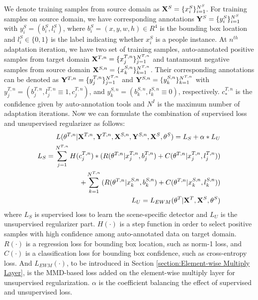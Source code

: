 \documentclass[runningheads]{llncs}
\begin{document}
We denote training samples from source domain as ${\bf X}^{S} = \{x^{S}_{i}\}^{N^{S}}_{i=1}$. For training samples on source domain, we have corresponding annotations ${\bf Y}^{S} = \{y^{S}_{i}\}^{N^{S}}_{i=1}$ with $y^{S}_{i} = (b^{S}_{i},l^{S}_{i})$, where $b^{S}_{i} = (x,y,w,h) \in R^{4}$ is the bounding box location and $l^{S}_{i} \in \{0,1\}$ is the label indicating whether $x^{S}_{i}$ is a people instance. At $n^{th}$ adaptation iteration, we have two set of training samples, auto-annotated positive samples from target domain ${\bf X}^{T,n} = \{x^{T,n}_{j}\}^{N^{T,n}}_{j=1}$ and tantamount negative samples from source domain ${\bf X}^{S,n} = \{x^{S,n}_{k}\}^{N^{T,n}}_{k=1}$. Their corresponding annotations can be denoted as ${\bf Y}^{T,n} = \{y^{T,n}_{j}\}^{N^{T,n}}_{j=1}$ and ${\bf Y}^{S,n} = \{y^{S,n}_{k}\}^{N^{T,n}}_{k=1}$ with $y^{T,n}_{j} = (b^{T,n}_{j},l^{T,n}_{j}\equiv1,c^{T,n}_{j})$, and $y^{S,n}_{k} = (b^{S,n}_{k},l^{S,n}_{k}\equiv0)$, respectively. $c^{T,n}_{*}$ is the confidence given by auto-annotation tools and $N^{I}$ is the maximum number of adaptation iterations. Now we can formulate the combination of supervised loss and unsupervised regularizer as follows:
\begin{eqnarray}
  L(\theta^{T,n}|{\bf X}^{T,n},{\bf Y}^{T,n},{\bf X}^{S,n},{\bf Y}^{S,n},{\bf X}^{S},\theta^{S}) = L_{S} + \alpha * L_{U} \\
 \nonumber  L_{S} = \sum^{N^{T,n}}_{j=1}{H(c^{T,n}_{j})* ( R(\theta^{T,n}|x^{T,n}_{j},b^{T,n}_{j})+C(\theta^{T,n}|x^{T,n}_{j},l^{T,n}_{j}) )} \\
             + \sum^{N^{T,n}}_{k=1}{( R(\theta^{T,n}|x^{S,n}_{k},b^{S,n}_{k})+C(\theta^{T,n}|x^{S,n}_{k},l^{S,n}_{k}) )}\\
  L_{U} = L_{EWM}(\theta^{T}|{\bf X}^{T},{\bf X}^{S},\theta^{S}) \label{Eq:lmmd}
\end{eqnarray}
where $L_{S}$ is supervised loss to learn the scene-specific detector and $L_{U}$ is the unsupervised regularizer part. $H(\cdot)$ is a step function in order to select positive samples with high confidence among auto-annotated data on target domain. $R(\cdot)$ is a regression loss for bounding box location, such as norm-1 loss, and $C(\cdot)$ is a classification loss for bounding box confidence, such as cross-entropy loss. And $L_{EWM}(\cdot)$, to be introduced in Section \ref{section:Element-wise Multiply Layer}, is the MMD-based loss added on the element-wise multiply layer for unsupervised regularization. $\alpha$ is the coefficient balancing the effect of supervised and unsupervised loss.
\end{document}
